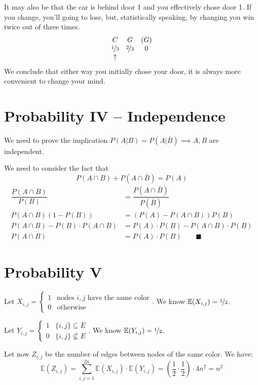 \documentclass{article}
\begin{document}
It may also be that the car is behind door 1 and you effectively chose door 1. If you change, you'll going to lose, but, statistically speaking, by changing you win twice out of three times.
\[\begin{array}{ccc}
     C & G & (G) \\
    \nicefrac{1}{3}  & \nicefrac{2}{3} & 0\\
     \uparrow & &
\end{array}\]
We conclude that either way you initially chose your door, it is always more convenient to change your mind.

\section{Probability IV -- Independence}
We need to prove the implication $P(A|B) = P(A|\bar B) \implies A, B$ are independent.

We need to consider the fact that \[ P(A \cap B) + P(A \cap \bar B) = P(A)\]
\begin{align*}
     \dfrac{P(A\cap B)}{P(B)} &= \dfrac{P(A \cap \bar B)}{P(\bar B)}  \\
     P(A \cap B)(1-P(B)) &= (P(A)-P(A\cap B))P(B) \\
     P(A \cap B) - P(B)\cdot P(A\cap B) &= P(A)\cdot P(B) - P(A \cap B)\cdot P(B) \\
     P(A \cap B) &= P(A) \cdot P(B) \qquad \blacksquare
\end{align*}

\section{Probability V}
Let $X_{i,j} = \left\{
\begin{array}{cl}
   1  & \text{nodes } i, j \text{ have the same color} \\
    0 & \text{otherwise}
\end{array}
\right.$.
We know $\mathbb E(X_{i,j}) = \nicefrac{1}{2}$.

Let $Y_{i,j} = \left\{
\begin{array}{cl}
   1  & \{i,j\} \subseteq E \\
    0 & \{i,j\} \nsubseteq E
\end{array}
\right.$.
We know $\mathbb E(Y_{i,j}) = \nicefrac{1}{2}$.

Let now $Z_{i,j}$ be the number of edges between nodes of the same color.
We have: \[\mathbb E(Z_{i,j}) = \sum_{i,j=1}^{2n} \mathbb E(X_{i,j}) \cdot \mathbb E(Y_{i,j}) = \left(\dfrac{1}{2} \cdot \dfrac{1}{2}\right)\cdot 4n^2 = n^2\]
\end{document}
